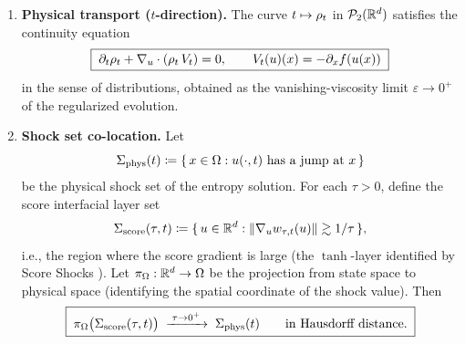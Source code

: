 \begin{theorem}
\begin{enumerate}
\item[(B)] \textbf{Physical transport ($t$-direction).} The curve $t \mapsto \rho_{t}$ in $\mathcal{P}_{2}(\mathbb{R}^{d})$ satisfies the continuity equation
\begin{equation}
\boxed{\; \partial_{t} \rho_{t} + \nabla_{u} \cdot (\rho_{t} \, V_{t}) = 0, \qquad
V_{t}(u)(x) = -\partial_{x} f(u(x)) \;}
\label{eq:thm1-physical-transport}
\end{equation}
in the sense of distributions, obtained as the vanishing-viscosity limit $\varepsilon \to 0^{+}$ of the regularized evolution.

\item[(C)] \textbf{Shock set co-location.} Let
\begin{equation}
\Sigma_{\mathrm{phys}}(t) \coloneqq \{\, x \in \Omega : u(\cdot, t) \text{ has a jump at } x \,\}
\label{eq:thm1-phys-shock}
\end{equation}
be the physical shock set of the entropy solution. For each $\tau > 0$, define the score interfacial layer set
\begin{equation}
\Sigma_{\mathrm{score}}(\tau, t) \coloneqq \{\, u \in \mathbb{R}^{d} : \lVert \nabla_{u} w_{\tau, t}(u) \rVert \gtrsim 1 / \tau \,\},
\label{eq:thm1-score-shock}
\end{equation}
i.e., the region where the score gradient is large (the $\tanh$-layer identified by Score Shocks \citep{sarkar2026scoreshocks}). Let $\pi_{\Omega}: \mathbb{R}^{d} \to \Omega$ be the projection from state space to physical space (identifying the spatial coordinate of the shock value). Then
\begin{equation}
\boxed{\; \pi_{\Omega}\big(\Sigma_{\mathrm{score}}(\tau, t)\big) \;\xrightarrow{\; \tau \to 0^{+} \;}\; \Sigma_{\mathrm{phys}}(t) \qquad \text{in Hausdorff distance.} \;}
\label{eq:thm1-shock-colocation}
\end{equation}
\end{enumerate}
\end{theorem}

